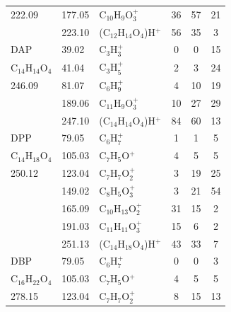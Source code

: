 {\begin{longtable}[c]{lllccc}
222.09          & 177.05               & C$_{10}$H$_9$O$_3^+$     & 36           & 57           & 21           \\
          & 223.10                & (C$_{12}$H$_{14}$O$_4$)H$^+$ & 56           & 35           & 3            \\
\hline
DAP                                                      & 39.02  & C$_3$H$_3^+$                        & 0  & 0  & 15 \\
C$_{14}$H$_{14}$O$_4$ & 41.04  & C$_3$H$_5^+$                        & 2  & 3  & 24 \\
246.09                                                   & 81.07  & C$_6$H$_9^+$                        & 4  & 10 & 19 \\
                                                         & 189.06 & C$_{11}$H$_9$O$_3^+$     & 10 & 27 & 29 \\
                                                         & 247.10  & (C$_{14}$H$_{14}$O$_4$)H$^+$ & 84 & 60 & 13\\
\hline
DPP       & 79.05                & C$_6$H$_7^+$                           & 1            & 1            & 5            \\
C$_{14}$H$_{18}$O$_4$          & 105.03               & C$_7$H$_5$O$^+$                          & 4            & 5            & 5            \\
250.12          & 123.04               & C$_7$H$_7$O$_2^+$      & 3            & 19           & 25           \\
          & 149.02               & C$_8$H$_5$O$_3^+$      & 3            & 21           & 54           \\
          & 165.09               & C$_{10}$H$_{13}$O$_2^+$    & 31           & 15           & 2            \\
          & 191.03               & C$_{11}$H$_{11}$O$_3^+$    & 15           & 6            & 2            \\
          & 251.13               & (C$_{14}$H$_{18}$O$_4$)H$^+$ & 43           & 33           & 7            \\
\hline
DBP                                                      & 79.05  & C$_6$H$_7^+$                        & 0  & 0  & 3  \\
C$_{16}$H$_{22}$O$_4$ & 105.03 & C$_7$H$_5$O$^+$                       & 4  & 5  & 5  \\
278.15                                                   & 123.04 & C$_7$H$_7$O$_2^+$      & 8  & 15 & 13 \\

\end{longtable}}
